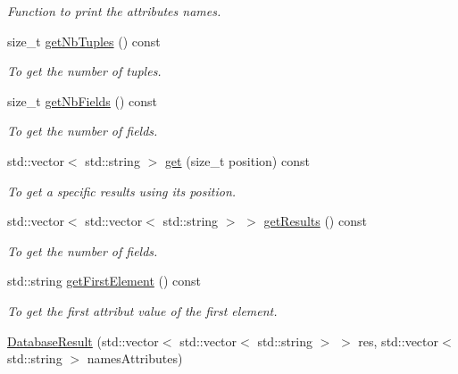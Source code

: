 \begin{DoxyCompactItemize}
\begin{DoxyCompactList}\small\item\em Function to print the attributes names. \item\end{DoxyCompactList}\item 
size\_\-t \hyperlink{classDatabaseResult_a6b425ff8cd457025a473afdc1e4d1535}{getNbTuples} () const 
\begin{DoxyCompactList}\small\item\em To get the number of tuples. \item\end{DoxyCompactList}\item 
size\_\-t \hyperlink{classDatabaseResult_a793321da7e96547dbb0cdc97a80d09fe}{getNbFields} () const 
\begin{DoxyCompactList}\small\item\em To get the number of fields. \item\end{DoxyCompactList}\item 
std::vector$<$ std::string $>$ \hyperlink{classDatabaseResult_af129f9b5cced14a65917ca0d86f77ffc}{get} (size\_\-t position) const 
\begin{DoxyCompactList}\small\item\em To get a specific results using its position. \item\end{DoxyCompactList}\item 
std::vector$<$ std::vector$<$ std::string $>$ $>$ \hyperlink{classDatabaseResult_a0068ceed5d4907a7cd1d62cb2a57f173}{getResults} () const 
\begin{DoxyCompactList}\small\item\em To get the number of fields. \item\end{DoxyCompactList}\item 
std::string \hyperlink{classDatabaseResult_addfd43669b9408978b4da87a962f1e8b}{getFirstElement} () const 
\begin{DoxyCompactList}\small\item\em To get the first attribut value of the first element. \item\end{DoxyCompactList}\item 
\hypertarget{classDatabaseResult_a703ad51e1e44f037ae26df7610ba54ae}{
\hyperlink{classDatabaseResult_a703ad51e1e44f037ae26df7610ba54ae}{DatabaseResult} (std::vector$<$ std::vector$<$ std::string $>$ $>$ res, std::vector$<$ std::string $>$ namesAttributes)}
\label{classDatabaseResult_a703ad51e1e44f037ae26df7610ba54ae}


\end{DoxyCompactItemize}

